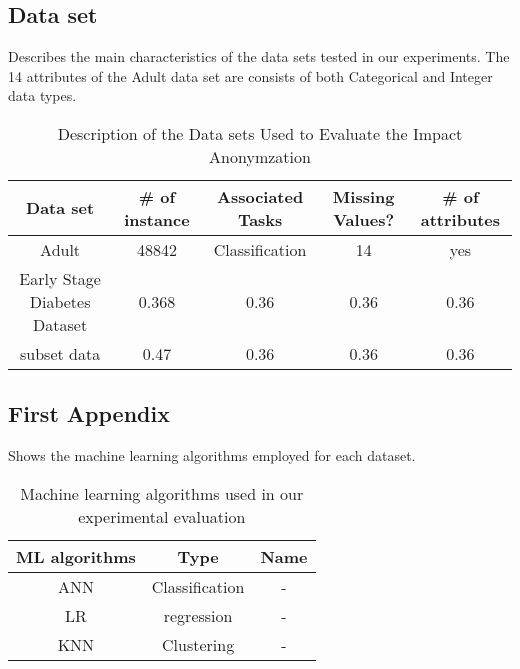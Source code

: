 \onecolumn

\appendix
\begin{appendices}
\section{}
\subsection{Data set}
Describes the main characteristics of the data sets tested in our experiments. The 14 attributes of the Adult data set are consists of both Categorical and Integer data types.
\begin{table}[H]
\label{Early Stage Diabetes}
    \centering
    \begin{tabular}{|c|c|c|c|c|}
    \hline
    \textbf{Data set}  &  \textbf{# of instance } &  \textbf{Associated Tasks} &  \textbf{Missing Values?} &  \textbf{# of attributes }\\
    \hline
    Adult\cite{UCIAdultDataset} &  48842  &  Classification &  14  &  yes \\
    \hline
      Early Stage Diabetes Dataset \cite{ucidiabetes}&  0.368 &  0.36 &  0.36 &  0.36 \\
    \hline
    subset data  &  0.47 &  0.36 &  0.36 &  0.36  \\
    \hline
    \end{tabular}
    \caption{ Description of the Data sets Used to Evaluate the Impact Anonymzation}
    \label{tab:Data set}
\end{table}

\subsection{First Appendix}
Shows the machine learning algorithms employed for each dataset.
\begin{table}[H]
\label{Early Stage Diabetes}
    \centering
    \begin{tabular}{|c|c|c|}
    \hline
    \textbf{ML algorithms}  &  \textbf{Type} &  \textbf{Name}\\
    \hline
    ANN &  Classification  &  -  \\
    \hline
      LR &  regression &  - \\
    \hline
    KNN  &  Clustering &  - \\
    \hline
    \end{tabular}
    \caption{Machine learning algorithms used in our experimental evaluation}
    \label{tab:ML}
\end{table}

\label{sec:apx:first_appendix}

\end{appendices}
